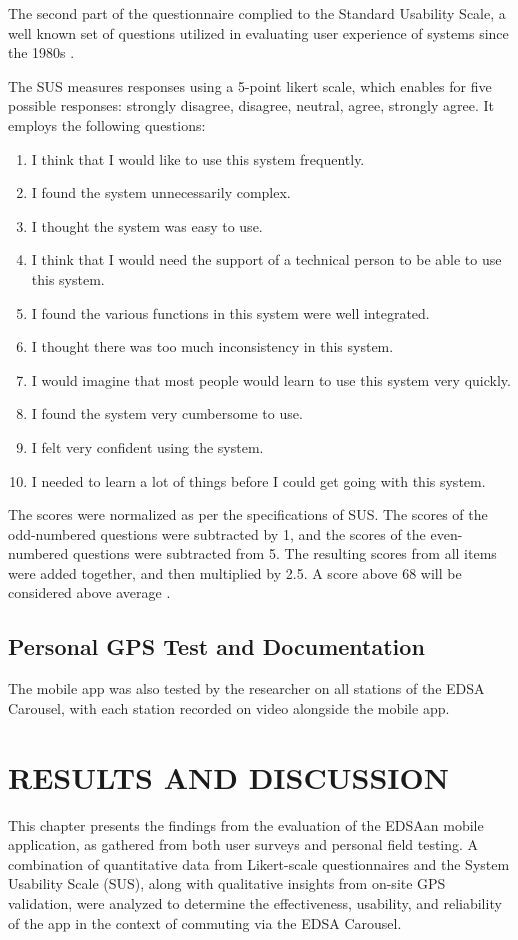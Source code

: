 \documentclass{icsthesis}
\begin{document}
\begin{mainmatter}
The second part of the questionnaire complied to the Standard Usability Scale, a well known set of questions utilized in evaluating user experience of systems since the 1980s \citep{Ref:010}.

The SUS measures responses using a 5-point likert scale, which enables for five possible responses: strongly disagree, disagree, neutral, agree, strongly agree. It employs the following questions:
\begin{enumerate}
    \item I think that I would like to use this system frequently.
    \item I found the system unnecessarily complex.
    \item I thought the system was easy to use.
    \item I think that I would need the support of a technical person to be able to use this system.
    \item I found the various functions in this system were well integrated.
    \item I thought there was too much inconsistency in this system.
    \item I would imagine that most people would learn to use this system very quickly.
    \item I found the system very cumbersome to use.
    \item I felt very confident using the system.
    \item I needed to learn a lot of things before I could get going with this system.

\end{enumerate}
The scores were normalized as per the specifications of SUS. The scores of the odd-numbered questions were subtracted by 1, and the scores of the even-numbered questions were subtracted from 5. The resulting scores from all items were added together, and then multiplied by 2.5. A score above 68 will be considered above average \citep{Ref:019}.

\subsection{Personal GPS Test and Documentation}
The mobile app was also tested by the researcher on all stations of the EDSA Carousel, with each station recorded on video alongside the mobile app.
		
		\section{RESULTS AND DISCUSSION}
This chapter presents the findings from the evaluation of the EDSAan mobile application, as gathered from both user surveys and personal field testing. A combination of quantitative data from Likert-scale questionnaires and the System Usability Scale (SUS), along with qualitative insights from on-site GPS validation, were analyzed to determine the effectiveness, usability, and reliability of the app in the context of commuting via the EDSA Carousel.


\end{mainmatter}
\end{document}
